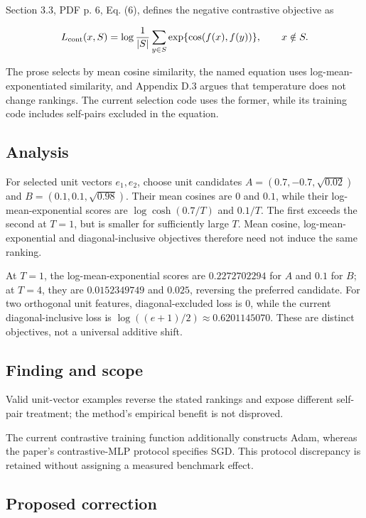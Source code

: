 \documentclass[11pt]{article}
\begin{document}
Section 3.3, PDF p. 6, Eq. (6), defines the negative contrastive objective as

\[ L_{\rm cont}(x,S)=\log\frac1{|S|}\sum_{y\in S} \exp\{\cos(f(x),f(y))\},\qquad x\notin S. \]

The prose selects by mean cosine similarity, the named equation uses log-mean-exponentiated similarity, and Appendix D.3 argues that temperature does not change rankings. The current selection code uses the former, while its training code includes self-pairs excluded in the equation.

\subsection*{Analysis}

For selected unit vectors \(e_1,e_2\), choose unit candidates \(A=(0.7,-0.7,\sqrt{0.02})\) and \(B=(0.1,0.1,\sqrt{0.98})\). Their mean cosines are \(0\) and \(0.1\), while their log-mean-exponential scores are \(\log\cosh(0.7/T)\) and \(0.1/T\). The first exceeds the second at \(T=1\), but is smaller for sufficiently large \(T\). Mean cosine, log-mean-exponential and diagonal-inclusive objectives therefore need not induce the same ranking.

At \(T=1\), the log-mean-exponential scores are \(0.2272702294\) for \(A\) and \(0.1\) for \(B\); at \(T=4\), they are \(0.0152349749\) and \(0.025\), reversing the preferred candidate. For two orthogonal unit features, diagonal-excluded loss is \(0\), while the current diagonal-inclusive loss is \(\log((e+1)/2)\approx0.6201145070\). These are distinct objectives, not a universal additive shift.

\subsection*{Finding and scope}

Valid unit-vector examples reverse the stated rankings and expose different self-pair treatment; the method’s empirical benefit is not disproved.

The current contrastive training function additionally constructs Adam, whereas the paper’s contrastive-MLP protocol specifies SGD. This protocol discrepancy is retained without assigning a measured benchmark effect.

\subsection*{Proposed correction}
\end{document}
